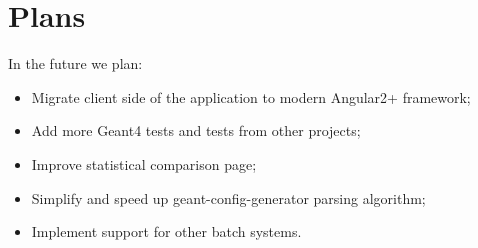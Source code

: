 \section{Plans}
\label{sec-plans}

In the future we plan:
\begin{itemize}
	\item Migrate client side of the application to modern Angular2+ framework;
	\item Add more Geant4 tests and tests from other projects;
	\item Improve statistical comparison page;
	\item Simplify and speed up geant-config-generator parsing algorithm;
	\item Implement support for other batch systems.
\end{itemize}
